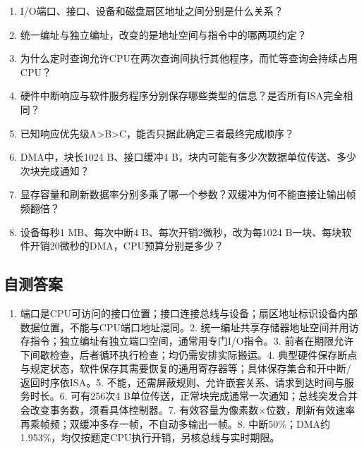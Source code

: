 \begin{enumerate}
\def\labelenumi{\arabic{enumi}.}
\tightlist
\item
  I/O端口、接口、设备和磁盘扇区地址之间分别是什么关系？
\item
  统一编址与独立编址，改变的是地址空间与指令中的哪两项约定？
\item
  为什么定时查询允许CPU在两次查询间执行其他程序，而忙等查询会持续占用CPU？
\item
  硬件中断响应与软件服务程序分别保存哪些类型的信息？是否所有ISA完全相同？
\item
  已知响应优先级A\textgreater B\textgreater C，能否只据此确定三者最终完成顺序？
\item
  DMA中，块长1024 B、接口缓冲4 B，块内可能有多少次数据单位传送、多少次块完成通知？
\item
  显存容量和刷新数据率分别多乘了哪一个参数？双缓冲为何不能直接让输出帧频翻倍？
\item
  设备每秒1 MB、每次中断4 B、每次开销2微秒，改为每1024 B一块、每块软件开销20微秒的DMA，CPU预算分别是多少？
\end{enumerate}

\subsection{自测答案}\label{CO07-recall-answers}

\begin{enumerate}
\def\labelenumi{\arabic{enumi}.}
\tightlist
\item
  端口是CPU可访问的接口位置；接口连接总线与设备；扇区地址标识设备内部数据位置，不能与CPU端口地址混同。2. 统一编址共享存储器地址空间并用访存指令；独立编址有独立端口空间，通常用专门I/O指令。3. 前者在期限允许下间歇检查，后者循环执行检查；均仍需安排实际搬运。4. 典型硬件保存断点与规定状态，软件保存其需要恢复的通用寄存器等；具体保存集合和开中断/返回时序依ISA。5. 不能，还需屏蔽规则、允许嵌套关系、请求到达时间与服务时长。6. 可有256次4 B单位传送，正常块完成通常一次通知；总线突发合并会改变事务数，须看具体控制器。7. 有效容量为像素数\ensuremath{\times}位数，刷新有效速率再乘帧频；双缓冲多存一帧，不自动多输出一帧。8. 中断50\%；DMA约1.953\%，均仅按题定CPU执行开销，另核总线与实时期限。
\end{enumerate}
